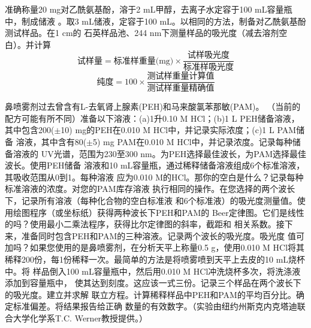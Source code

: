 \begin{exercise}\label{exer:5.9}
准确称量20 mg对乙酰氨基酚，溶于2 mL甲醇，去离子水定容于100 mL容量瓶中，制成储液
。取3 mL储液，定容于100 mL。以相同的方法，制备对乙酰氨基酚测试样品。在1 cm的
石英样品池、244 nm下测量样品的吸光度（减去溶剂空白）。并计算
\[
\text{试样量}=\text{标准样重量(mg)}\times\frac{\text{试样吸光度}}{\text{
标准样吸光度}}
\]
\[
\text{纯度}=100\times\frac{\text{测试样重量计算值}}{\text{测试样重量精确值}}
\]
\end{exercise}
\begin{exercise}\label{exer:5.10}
鼻喷雾剂过去曾含有L-去氧肾上腺素(PEH)和马来酸氯苯那敏(PAM)。
（当前的配方可能有所不同）准备以下溶液：(a)1升0.10 M HCl；(b)1 L PEH储备溶液，
其中包含200($\pm$10) mg的PEH在0.010 M HCl中，并记录实际浓度；(c)1 L PAM储备
溶液，其中含有80($\pm$5) mg PAM在0.010 M HCl中，并记录浓度。记录每种储备溶液的
UV光谱，范围为230至300 nm。为PEH选择最佳波长，为PAM选择最佳波长。使用PEH储备
溶液和10 mL容量瓶，通过稀释储备溶液组成6个标准溶液，其吸收范围从0到1。每种溶液
应为0.010 M的HCl。那你的空白是什么？记录每种标准溶液的浓度。对您的PAM库存溶液
执行相同的操作。在您选择的两个波长下，记录所有溶液（每种化合物的空白标准液
和6个标准液）的吸光度测量值。使用绘图程序（或坐标纸）获得两种波长下PEH和PAM的
Beer定律图。它们是线性的吗？使用最小二乘法程序，获得比尔定律图的斜率，截距和
相关系数。接下来，准备同时包含PEH和PAM的三种溶液。记录两个波长的吸光度。吸光度
值可加吗？如果您使用的是鼻喷雾剂，在分析天平上称量0.5 g，使用0.010 M HCl将其
稀释200份，每1份稀释一次。最简单的方法是将喷雾喷到天平上去皮的10 mL烧杯中。将
样品倒入100 mL容量瓶中，然后用0.010 M HCl冲洗烧杯多次，将洗涤液添加到容量瓶中，
使其达到刻度。这应该一式三份。记录三个样品在两个波长下的吸光度。建立并求解
联立方程。计算稀释样品中PEH和PAM的平均百分比。确定标准偏差。将结果报告给正确
数量的有效数字。（实验由纽约州斯克内克塔迪联合大学化学系T.C. Werner教授提供。）
\end{exercise}
\newpage
